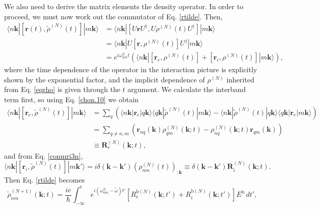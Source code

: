 We also need to derive the matrix elements the density operator. In order to
proceed, we must now work out the commutator of Eq. \eqref{rtilde}. Then,
\begin{align}\label{conmu1}
\langle n\mathbf{k}|
\left[\mathbf{r}(t),\tilde{\rho}^{(N)}(t)\right]
|m\mathbf{k}\rangle
&= \langle n\mathbf{k}|
\left[U\mathbf{r}U^\dagger,U\rho^{(N)}(t)U^\dagger\right]
|m\mathbf{k}\rangle\nonumber \\
&= \langle n\mathbf{k}|
U\left[\mathbf{r},\rho^{(N)}(t)\right]U^\dagger
|m\mathbf{k}\rangle\\
&= e^{i\omega^\Sigma_{nm}t}
\left(
\langle n\mathbf{k}|
  \left[\mathbf{r}_{e},\rho^{(N)}(t)\right]
+ \left[\mathbf{r}_{i},\rho^{(N)}(t)\right]
|m\mathbf{k}\rangle
\right)\nonumber,
\end{align}
where the time dependence of the operator in the interaction picture is
explicitly shown by the exponential factor, and the implicit dependence of
$\rho^{(N)}$ inherited from Eq. \eqref{eqrho} is given through the $t$ argument.
We calculate the interband term first, so using Eq. \eqref{chon.10} we obtain
\begin{align}\label{conmu2}
\langle n\mathbf{k}|
\left[\mathbf{r}_{e},\tilde{\rho}^{(N)}(t)\right]
|m\mathbf{k}\rangle
&= \sum_{q}
\left(
  \langle n\mathbf{k}| \mathbf{r}_{e} |q\mathbf{k}\rangle
  \langle q\mathbf{k}| \tilde{\rho}^{(N)}(t) |m\mathbf{k}\rangle
- \langle n\mathbf{k}| \tilde{\rho}^{(N)}(t) |q\mathbf{k}\rangle
  \langle q\mathbf{k}| \mathbf{r}_{e} |m\mathbf{k}\rangle
\right)\nonumber \\
&= \sum_{q\ne n,m}
\left(
  \mathbf{r}_{nq}(\mathbf{k})
  \rho^{(N)}_{q m}(\mathbf{k};t)
- \rho^{(N)}_{nq}(\mathbf{k};t)
  \mathbf{r}_{q m}(\mathbf{k})
\right)\nonumber\\
& \equiv \mathbf{R}^{(N)}_{e}(\mathbf{k};t),
\end{align}
and from Eq. \eqref{conmri3n},
\begin{equation}\label{conmri4}
\langle n\mathbf{k}|
[\mathbf{r}_i,\tilde{\rho}^{(N)}(t)]
|m\mathbf{k}'\rangle
=i \delta(\mathbf{k}-\mathbf{k}') (\rho^{(N)}_{nm}(t))_{;\mathbf{k}}
\equiv \delta(\mathbf{k}-\mathbf{k}')\mathbf{R}_i^{(N)}(\mathbf{k};t).
\end{equation}
Then Eq. \eqref{rtilde} becomes
\begin{equation}\label{rtilde2}
\tilde{\rho}^{(N+1)}_{nm}(\mathbf{k};t)
= \frac{ie}{\hbar}\int_{-\infty}^{t}
e^{i(\omega^{\Sigma}_{nm} - \tilde{\omega})t'}
\left[
  R_{e}^{\mathrm{b}(N)}(\mathbf{k};t')
+ R_{i}^{\mathrm{b}(N)}(\mathbf{k};t')
\right]
E^{\mathrm{b}}\,dt',
\end{equation}
